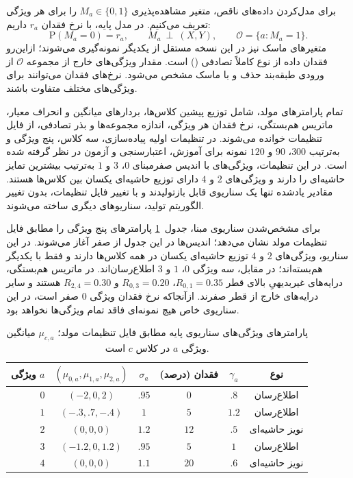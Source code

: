 برای مدل‌کردن داده‌های ناقص، متغیر مشاهده‌پذیری $M_a\in\{0,1\}$ را برای هر ویژگی تعریف می‌کنیم. در مدل پایه، با نرخ فقدان $r_a$ داریم:
\begin{equation}\label{eq:ch4-synthetic-mask}
\mathrm P(M_a=0)=r_a,\qquad
M_a\ \perp\ (X,Y),
\qquad
\mathcal O=\{a:M_a=1\}.
\end{equation}
متغیرهای ماسک نیز در این نسخه مستقل از یکدیگر نمونه‌گیری می‌شوند؛ ازاین‌رو فقدان داده از نوع کاملاً تصادفی () است. مقدار ویژگی‌های خارج از مجموعه $\mathcal O$ از ورودی طبقه‌بند حذف و با ماسک مشخص می‌شود. نرخ‌های فقدان می‌توانند برای ویژگی‌های مختلف متفاوت باشند.

تمام پارامترهای مولد، شامل توزیع پیشین کلاس‌ها، بردارهای میانگین و انحراف معیار، ماتریس هم‌بستگی، نرخ فقدان هر ویژگی، اندازه مجموعه‌ها و بذر تصادفی، از فایل تنظیمات  خوانده می‌شوند. در تنظیمات اولیه پیاده‌سازی، سه کلاس، پنج ویژگی و به‌ترتیب $300$، $90$ و $120$ نمونه برای آموزش، اعتبارسنجی و آزمون در نظر گرفته شده است. در این تنظیمات، ویژگی‌های با اندیس صفرمبنای $0$، $3$ و $1$ به‌ترتیب بیشترین تمایز حاشیه‌ای را دارند و ویژگی‌های $2$ و $4$ دارای توزیع حاشیه‌ای یکسان بین کلاس‌ها هستند. مقادیر یادشده تنها یک سناریوی قابل بازتولیدند و با تغییر فایل تنظیمات، بدون تغییر الگوریتم تولید، سناریوهای دیگری ساخته می‌شوند.


برای مشخص‌شدن سناریوی مبنا، جدول~\ref{tab:ch4-base-generator-features}
پارامترهای پنج ویژگی را مطابق فایل تنظیمات مولد نشان می‌دهد؛
اندیس‌ها در این جدول از صفر آغاز می‌شوند.
در این سناریو، ویژگی‌های $2$ و $4$ توزیع حاشیه‌ای یکسان در
همه کلاس‌ها دارند و فقط با یکدیگر هم‌بسته‌اند؛ در مقابل،
سه ویژگی $0$، $1$ و $3$ اطلاع‌رسان‌اند.
در ماتریس هم‌بستگی، درایه‌های غیربدیهیِ بالای قطر
$R_{0,1}=0.35$، $R_{0,3}=0.20$ و $R_{2,4}=0.30$
هستند و سایر درایه‌های خارج از قطر صفرند.
ازآنجاکه نرخ فقدان ویژگی $0$ صفر است، در این سناریوی خاص
هیچ نمونه‌ای فاقد تمام ویژگی‌ها نخواهد بود.

\begin{table}[htbp]
\centering\small
\caption{پارامترهای ویژگی‌های سناریوی پایه مطابق فایل تنظیمات مولد؛
$\mu_{c,a}$ میانگین ویژگی $a$ در کلاس $c$ است.}
\label{tab:ch4-base-generator-features}
\begin{tabular}{rccccc}\hline
ویژگی $a$ & $(\mu_{0,a},\mu_{1,a},\mu_{2,a})$ &
$\sigma_a$ & فقدان (درصد) & $\gamma_a$ & نوع\\\hline
$0$ & $(-2,0,2)$ & $.95$ & $0$ & $.8$ & اطلاع‌رسان\\
$1$ & $(-.3,.7,-.4)$ & $1$ & $5$ & $1.2$ & اطلاع‌رسان\\
$2$ & $(0,0,0)$ & $1.2$ & $12$ & $.5$ & نویز حاشیه‌ای\\
$3$ & $(-1.2,0,1.2)$ & $.95$ & $5$ & $1$ & اطلاع‌رسان\\
$4$ & $(0,0,0)$ & $1.1$ & $20$ & $.6$ & نویز حاشیه‌ای\\\hline
\end{tabular}
\end{table}


